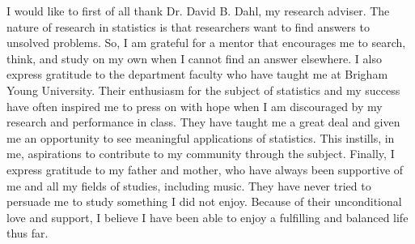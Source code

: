 I would like to first of all thank Dr. David B. Dahl, my research adviser. The nature of research in statistics is that researchers want to find answers to unsolved problems. So, I am grateful for a mentor that encourages me to search, think, and study on my own when I cannot find an answer elsewhere.  I also express gratitude to the department faculty who have taught me at Brigham Young University. Their enthusiasm for the subject of statistics and my success have often inspired me to press on with hope when I am discouraged by my research and performance in class. They have taught me a great deal and given me an opportunity to see meaningful applications of statistics. This instills, in me, aspirations to contribute to my community through the subject. Finally, I express gratitude to my father and mother, who have always been supportive of me and all my fields of studies, including music. They have never tried to persuade me to study something I did not enjoy. Because of their unconditional love and support, I believe I have been able to enjoy a fulfilling and balanced life thus far.
